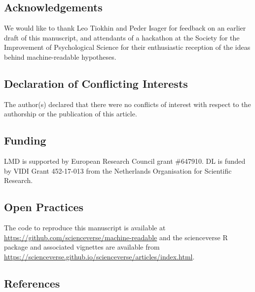 \documentclass[
  english,
  doc,floatsintext]{apa6}
\begin{document}
\hypertarget{acknowledgements}{%
\subsection{Acknowledgements}\label{acknowledgements}}

We would like to thank Leo Tiokhin and Peder Isager for feedback on an earlier draft of this manuscript, and attendants of a hackathon at the Society for the Improvement of Psychological Science for their enthusiastic reception of the ideas behind machine-readable hypotheses.

\hypertarget{declaration-of-conflicting-interests}{%
\subsection{Declaration of Conflicting Interests}\label{declaration-of-conflicting-interests}}

The author(s) declared that there were no conflicts of interest with respect to the authorship or the publication of this article.

\hypertarget{funding}{%
\subsection{Funding}\label{funding}}

LMD is supported by European Research Council grant \#647910. DL is funded by VIDI Grant 452-17-013 from the Netherlands Organisation for Scientific Research.

\hypertarget{open-practices}{%
\subsection{Open Practices}\label{open-practices}}

The code to reproduce this manuscript is available at \url{https://github.com/scienceverse/machine-readable} and the scienceverse R package and associated vignettes are available from \url{https://scienceverse.github.io/scienceverse/articles/index.html}.

\newpage

\hypertarget{references}{%
\subsection{References}\label{references}}

\begingroup
\setlength{\parindent}{-0.5in}
\setlength{\leftskip}{0.5in}
\end{document}
